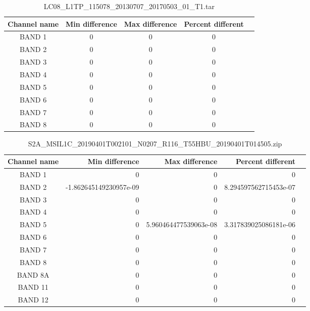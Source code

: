 \documentclass[a4paper]{article}
\begin{document}
    \begin{table}[ht!]
      \caption{LC08\_L1TP\_115078\_20130707\_20170503\_01\_T1.tar}\label{table:16}
      \centering
      \small
      \begin{tabular}{ccccc} \midrule
        \textbf{Channel name} & \textbf{Min difference} & \textbf{Max difference} & \textbf{Percent different} \\ \midrule
        BAND 1 & 0 & 0 & 0 \\
        BAND 2 & 0 & 0 & 0 \\
        BAND 3 & 0 & 0 & 0 \\
        BAND 4 & 0 & 0 & 0 \\
        BAND 5 & 0 & 0 & 0 \\
        BAND 6 & 0 & 0 & 0 \\
        BAND 7 & 0 & 0 & 0 \\
        BAND 8 & 0 & 0 & 0 \\ \midrule
      \end{tabular}
    \end{table}

  \clearpage

    \begin{table}[ht!]
      \caption{\footnotesize{S2A\_MSIL1C\_20190401T002101\_N0207\_R116\_T55HBU\_20190401T014505.zip}}\label{table:17}
      \centering
      \small
      \begin{tabular}{|c|n{2}{4}|n{2}{4}|n{2}{4}|n{2}{4}|} \hline
        \textbf{Channel name} & \textbf{Min difference} & \textbf{Max difference} & \textbf{Percent different} \\ \midrule
        BAND 1 & 0 & 0 & 0 \\
        BAND 2 & -1.862645149230957e-09 & 0 & 8.294597562715453e-07 \\
        BAND 3 & 0 & 0 & 0 \\
        BAND 4 & 0 & 0 & 0 \\
        BAND 5 & 0 & 5.960464477539063e-08 & 3.317839025086181e-06 \\
        BAND 6 & 0 & 0 & 0 \\
        BAND 7 & 0 & 0 & 0 \\
        BAND 8 & 0 & 0 & 0 \\
        BAND 8A & 0 & 0 & 0 \\
        BAND 11 & 0 & 0 & 0 \\
        BAND 12 & 0 & 0 & 0 \\ \midrule
      \end{tabular}
    \end{table}
\end{document}
